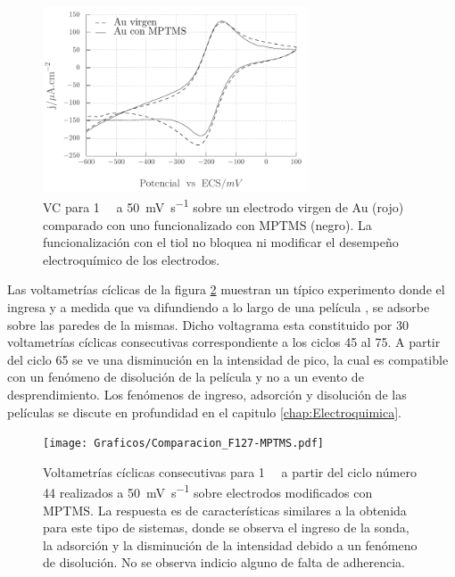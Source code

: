 					\begin{figure}[!ht]
							\begin{center}
							\includegraphics[width=0.70\textwidth]{Graficos/Comparacion_Au-MPTMS.pdf}
							\caption[Comparación de electrodos con y sin MPTMS]{VC para \aminorutenio\space \SI{1}{\milli\Molar} a \SI{50}{\milli\volt\per\second} sobre un electrodo virgen de Au (rojo) comparado con uno funcionalizado con MPTMS (negro). La funcionalización con el tiol no bloquea ni modificar el desempeño electroquímico de los electrodos.}
							\label{fig:comparaciones_MPTMS-A}
							\end{center}
							\end{figure}

             Las voltametrías cíclicas de la figura \ref{fig:comparaciones_MPTMS-B} muestran un típico experimento donde el \aminorutenio\space ingresa y a medida que va difundiendo a lo largo de una película \pdmF, se adsorbe sobre las paredes de la mismas. Dicho voltagrama esta constituido por 30 voltametrías cíclicas consecutivas correspondiente a los ciclos 45 al 75. A partir del ciclo 65 se ve una disminución en la intensidad de pico, la cual es compatible con un fenómeno de disolución de la película y no a un evento de desprendimiento. Los fenómenos de ingreso, adsorción y disolución de las películas se discute en profundidad en el capitulo \ref{chap:Electroquimica}.
       	
					\begin{figure}[!ht]
							\begin{center}
				 	   	    \texttt{[image: Graficos/Comparacion\_F127-MPTMS.pdf]}
				       		\caption[Comparación de superficies con y sin MPTMS.]{Voltametrías cíclicas consecutivas para \aminorutenio\space \SI{1}{\milli\Molar} a partir del ciclo número 44 realizados a \SI{50}{\milli\volt.\second^{-1}} sobre electrodos modificados con MPTMS. La respuesta es de características similares a la obtenida para este tipo de sistemas, donde se observa el ingreso de la sonda, la adsorción y la disminución de la intensidad debido a un fenómeno de disolución. No se observa indicio alguno de falta de adherencia.}
						 \label{fig:comparaciones_MPTMS-B}	
					    \end{center}
					    \end{figure}
		
